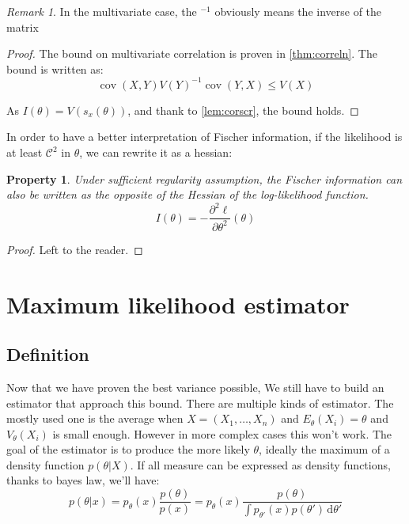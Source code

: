\documentclass[10pt,a4paper]{report}
\theoremstyle{plain}
\newtheorem{prop}[thm]{Property}
\theoremstyle{definition}
\theoremstyle{remark}
\newtheorem*{rem}{Remark}
\newcommand{\TODO}{\textbf{TODO}}
\newcommand{\dd}{\mathrm{d}}
\renewcommand{\leq}{\leqslant}
\DeclareMathOperator{\cov}{cov}
\newcommand{\class}[1]{{\mathscr{C}^{#1}}}
\begin{document}
\begin{rem}
  In the multivariate case, the ${}^{-1}$ obviously means the inverse of the matrix
\end{rem}

\begin{proof}
  The bound on multivariate correlation is proven in \cref{thm:correln}. The
  bound is written as:
  \[\cov(X,Y){V(Y)}^{-1}\cov(Y,X) \leq V(X)\]

  As $I(\theta) = V(s_x(\theta))$, and thank to \cref{lem:corscr}, the bound holds.
\end{proof}

In order to have a better interpretation of Fischer information, if the
likelihood is at least $\class 2$ in $\theta$, we can rewrite
it as a hessian:

\begin{prop}\label{prop:fisherhessian}
  Under sufficient regularity assumption,
  the Fischer information can also be written as the opposite of the Hessian of the
  log-likelihood function.
  \[I(\theta) = -\frac{\partial^2 \ell}{\partial \theta^2}(\theta)\]
\end{prop}

\begin{proof}
  Left to the reader.
\end{proof}







\section{Maximum likelihood estimator}

\subsection{Definition}

Now that we have proven the best variance possible, We still have to build an
estimator that approach this bound. There are multiple kinds of estimator. The
mostly used one is the average when $X = (X_1,\ldots,X_n)$ and
$E_\theta(X_i) = \theta$ and $V_\theta(X_i)$ is small enough. However in more
complex cases this won't work. The goal of the estimator is to produce the more
likely $\theta$, ideally the maximum of a density function $p(\theta | X)$.
If all measure can be expressed as density functions, thanks to bayes law, we'll have:
\begin{equation}\label{eqn:bayes}
  p(\theta|x) = p_\theta(x) \frac {p(\theta)}{p(x)}
  = p_\theta(x) \frac {p(\theta)}{\int p_{\theta'}(x)p(\theta')\,\dd \theta'}
\end{equation}
\end{document}
